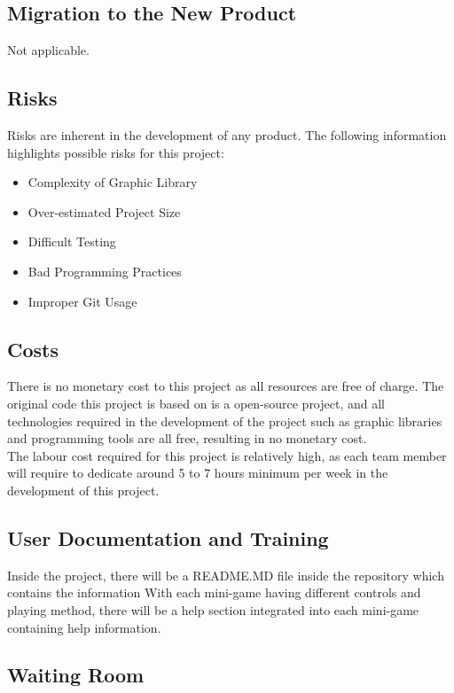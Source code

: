 \documentclass[12pt, titlepage]{article}
\begin{document}
\subsection{Migration to the New Product}

Not applicable.

\subsection{Risks}

Risks are inherent in the development of any product. The following information highlights possible risks for this project:
\begin{itemize}
    \item Complexity of Graphic Library
    \item Over-estimated Project Size
    \item Difficult Testing
    \item Bad Programming Practices
    \item Improper Git Usage
\end{itemize}

\subsection{Costs}

There is no monetary cost to this project as all resources are free of charge. The original code this project is based on is a open-source project, and all technologies required in the development of the project such as graphic libraries and programming tools are all free, resulting in no monetary cost.\\
The labour cost required for this project is relatively high, as each team member will require to dedicate around 5 to 7 hours minimum per week in the development of this project.

\subsection{User Documentation and Training}

Inside the project, there will be a README.MD file inside the repository which contains the information
With each mini-game having different controls and playing method, there will be a help section integrated into each mini-game containing help information.

\subsection{Waiting Room}
\end{document}
